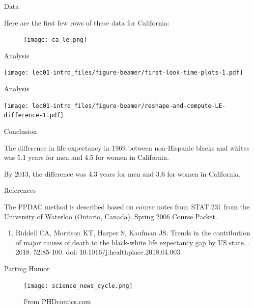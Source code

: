 \documentclass[ignorenonframetext,aspectratio=169]{beamer}
\providecommand{\tightlist}{%
  \setlength{\itemsep}{0pt}\setlength{\parskip}{0pt}}
\renewcommand{\textbf}{\structure}
\begin{document}
\begin{frame}{Data}

Here are the first few rows of these data for California:

\begin{figure}
\centering
\texttt{[image: ca\_le.png]}
\caption{}
\end{figure}

\end{frame}

\begin{frame}{Analysis}

\texttt{[image: lec01-intro\_files/figure-beamer/first-look-time-plots-1.pdf]}

\end{frame}

\begin{frame}{Analysis}

\texttt{[image: lec01-intro\_files/figure-beamer/reshape-and-compute-LE-difference-1.pdf]}

\end{frame}

\begin{frame}{Conclusion}

The difference in life expectancy in 1969 between non-Hispanic blacks
and whites was 5.1 years for men and 4.5 for women in California.

By 2013, the difference was 4.3 years for men and 3.6 for women in
California.

\end{frame}

\begin{frame}{References}

The PPDAC method is described based on course notes from STAT 231 from
the University of Waterloo (Ontario, Canada). Spring 2006 Course Packet.

\begin{enumerate}
\def\labelenumi{\arabic{enumi}.}
\tightlist
\item
  Riddell CA, Morrison KT, Harper S, Kaufman JS. Trends in the
  contribution of major causes of death to the black-white life
  expectancy gap by US state. \textbf{Health \& Place}. 2018. 52:85-100.
  doi: 10.1016/j.healthplace.2018.04.003.
\end{enumerate}

\end{frame}

\begin{frame}{Parting Humor}

\begin{figure}
\centering
\texttt{[image: science\_news\_cycle.png]}
\caption{From PHDcomics.com}
\end{figure}

\end{frame}
\end{document}

